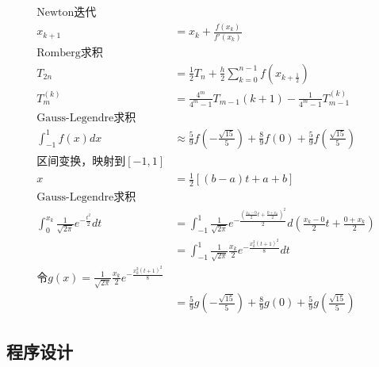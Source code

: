 \documentclass{article}
\begin{document}
\begin{align}
    \text{Newton迭代} & \nonumber \\
    x_{k+1} & = x_k + \frac{f(x_k)}{f'(x_k)} \\
    \text{Romberg求积} & \nonumber \\
    T_{2n} & = \frac{1}{2}T_n + \frac{h}{2}\sum_{k=0}^{n-1}f(x_{k+\frac{1}{2}}) \\
    T_m^{(k)} & = \frac{4^m}{4^m-1}T_{m-1}{(k+1)}-\frac{1}{4^m-1}T_{m-1}^{(k)} \\
    \text{Gauss-Legendre求积} & \nonumber \\
    \int_{-1}^1f(x)dx & \approx \frac{5}{9}f(-\frac{\sqrt{15}}{5})+\frac{8}{9}f(0)+\frac{5}{9}f(\frac{\sqrt{15}}{5}) \\
    \text{区间变换，映射到}[-1,1] & \nonumber \\
    x & = \frac{1}{2}[(b-a)t+a+b]  \\
    \text{Gauss-Legendre求积} & \nonumber \\
    \int_0^{x_k}\frac{1}{\sqrt{2\pi}}e^{-\frac{t^2}{2}}dt 
    & = \int_{-1}^{1}\frac{1}{\sqrt{2\pi}}e^{-\frac{(\frac{x_k-0}{2}t+\frac{0+x_k}{2})^2}{2}}
        d(\frac{x_k-0}{2}t+\frac{0+x_k}{2}) \nonumber \\
    & = \int_{-1}^{1}\frac{1}{\sqrt{2\pi}}\frac{x_k}{2}e^{-\frac{x_k^2(t+1)^2}{8}}dt \nonumber \\
    \text{令}g(x)=\frac{1}{\sqrt{2\pi}}\frac{x_k}{2}e^{-\frac{x_k^2(t+1)^2}{8}} & \nonumber \\
    & = \frac{5}{9}g(-\frac{\sqrt{15}}{5})+\frac{8}{9}g(0)+\frac{5}{9}g(\frac{\sqrt{15}}{5}) 
\end{align}

\subsection{程序设计}

\end{document}

